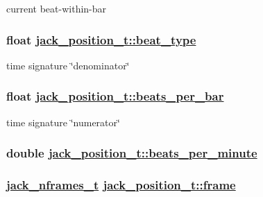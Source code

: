 current beat-within-bar \hypertarget{structjack__position__t_aa2956fbbf561096f9e38ab6350bdb20}{
\subsubsection[beat\_\-type]{\setlength{\rightskip}{0pt plus 5cm}float \hyperlink{structjack__position__t_aa2956fbbf561096f9e38ab6350bdb20}{jack\_\-position\_\-t::beat\_\-type}}}
\label{structjack__position__t_aa2956fbbf561096f9e38ab6350bdb20}


time signature \char`\"{}denominator\char`\"{} \hypertarget{structjack__position__t_95db8c9493cb07af52d4d2fe851c52af}{
\subsubsection[beats\_\-per\_\-bar]{\setlength{\rightskip}{0pt plus 5cm}float \hyperlink{structjack__position__t_95db8c9493cb07af52d4d2fe851c52af}{jack\_\-position\_\-t::beats\_\-per\_\-bar}}}
\label{structjack__position__t_95db8c9493cb07af52d4d2fe851c52af}


time signature \char`\"{}numerator\char`\"{} \hypertarget{structjack__position__t_348d88736ba362cf12317ec1f8af00ea}{
\subsubsection[beats\_\-per\_\-minute]{\setlength{\rightskip}{0pt plus 5cm}double \hyperlink{structjack__position__t_348d88736ba362cf12317ec1f8af00ea}{jack\_\-position\_\-t::beats\_\-per\_\-minute}}}
\label{structjack__position__t_348d88736ba362cf12317ec1f8af00ea}


\hypertarget{structjack__position__t_dcf3e36ee8115282aad46485cab6a4be}{
\subsubsection[frame]{\setlength{\rightskip}{0pt plus 5cm}\hyperlink{types_8h_fe9972a13782c1e282747fdb4bc46f9c}{jack\_\-nframes\_\-t} \hyperlink{structjack__position__t_dcf3e36ee8115282aad46485cab6a4be}{jack\_\-position\_\-t::frame}}}
\label{structjack__position__t_dcf3e36ee8115282aad46485cab6a4be}


